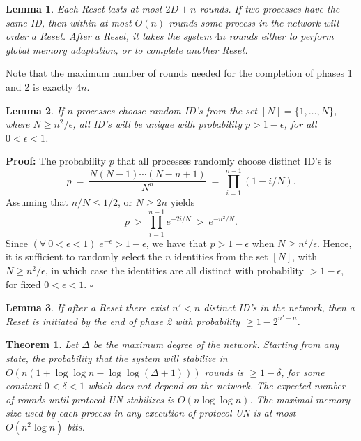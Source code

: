 \documentclass[10pt]{article}
\newtheorem{thm}{Theorem}[section]
\newtheorem{lemm}{Lemma}[section]
\newenvironment{proof}{\begin{trivlist}
                       \item[]\hspace{0cm}\textbf{Proof: }
                       \hspace{0cm} }{\hfill $\square$
                       \end{trivlist}}
\begin{document}
\begin{lemm}\label{lem:rounds}
Each Reset lasts at most $2D + n$ rounds. If two processes have the
same ID, then within at most $O(n)$ rounds some process in the network
will order a Reset. After a Reset, it takes the system $4n$ rounds
either to perform global memory adaptation, or to complete another
Reset.
\end{lemm}
Note that the maximum number of rounds needed for the completion of phases
1 and 2 is exactly $4n$.
\begin{lemm}\label{lem:ID's}
If $n$ processes choose random ID's from the set $[N] = \{1, \ldots ,N\}$,
where $N \geq n^{2}/{\epsilon}$, all ID's will be unique with probability
$p >1 - \epsilon$, for all $0 < \epsilon < 1$.
\end{lemm}

\begin{proof}
The probability $p$ that all processes randomly choose distinct ID's is
$$p \: = \: \frac{N (N - 1) \cdots (N - n + 1)}{N^{n}}
\: = \: \prod_{i=1}^{n-1} (1 - i/N).$$
Assuming that $n/N \leq 1/2$, or $N \geq 2n$ yields
$$p \: > \: \prod_{i=1}^{n-1} e^{-2i/N} \: >\: e^{-n^{2}/N}.$$
Since $(\forall \: 0 < \epsilon < 1) \; e^{-\epsilon} > 1-\epsilon$, we
have that $p > 1 - \epsilon$ when $N \geq n^{2}/{\epsilon}$. Hence,
it is sufficient to randomly select the $n$ identities from the set $[N]$,
with $N \geq n^{2}/{\epsilon}$, in which case the identities are all
distinct with probability $> 1 - \epsilon$, for fixed $0 < \epsilon < 1$.
\end{proof}

\begin{lemm}\label{lem:reset}
If after a Reset there exist $n' < n$ distinct ID's in the network, then a
Reset is initiated by the end of phase 2 with probability $\geq 1- 2^{n'-n}$.
\end{lemm}

\sloppypar
\begin{thm}\label{thm:unc}
Let $\Delta$ be the maximum degree of the network. Starting from any state,
the probability that the system will stabilize in $O\left(n (1 + \log\log n
- \log\log(\Delta+1)) \right)$ rounds is $\ge 1 - \delta$, for some constant
$0<\delta <1$ which does not depend on the network. The expected number
of rounds until protocol UN stabilizes is $O(n \log\log n)$. The maximal
memory size used by each process in any execution of protocol UN is at most
$O(n^2 \log n)$ bits.
\end{thm}
\end{document}
